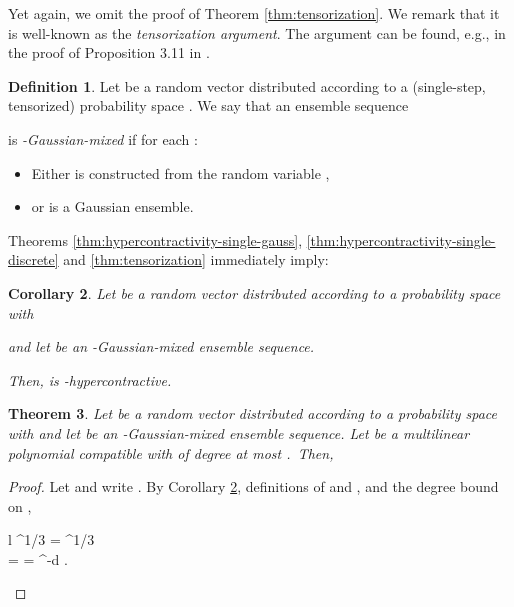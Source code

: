 \documentclass{daj}
\newcommand{\1}{\mathbbm{1}}
\theoremstyle{plain}
\newtheorem{theorem}{Theorem}[section]
\newtheorem{corollary}[theorem]{Corollary}
\theoremstyle{definition}
\newtheorem{definition}[theorem]{Definition}
\DeclareMathOperator*{\EE}{E}
\begin{document}
Yet again, we omit the proof of Theorem \ref{thm:tensorization}.
We remark that it is well-known as the \emph{tensorization argument}.
The argument can be found, e.g., in the proof of Proposition 3.11
in \cite{MOO10}.

\begin{definition}
Let  be a random vector distributed
according to a (single-step, tensorized) probability space 
.
We say that an ensemble sequence

is \emph{-Gaussian-mixed} if
for each :
\begin{itemize}
\item Either  is constructed
from the random variable ,
\item or  is a Gaussian ensemble.
\end{itemize}
\end{definition}

Theorems \ref{thm:hypercontractivity-single-gauss},
\ref{thm:hypercontractivity-single-discrete} and
\ref{thm:tensorization} immediately imply:

\begin{corollary}
\label{cor:hypercontractivity}
Let  be a random vector distributed according to
a probability space
 with

and let  be an 
-Gaussian-mixed
ensemble sequence.

Then,  is -hypercontractive.
\end{corollary}

\begin{theorem}
\label{thm:hypercontractivity-degree}
Let  be a random vector distributed according to a
probability space 
with 
and let  be an -Gaussian-mixed
ensemble sequence.
Let  be a multilinear
polynomial compatible with  of degree at most .\
Then,

\end{theorem}

\begin{proof}
Let  and write
. 
By Corollary \ref{cor:hypercontractivity}, definitions of  and
, and the degree bound on ,
\begin{IEEEeqnarray*}{l}
\EE {}^{1/3} 
= \EE \left[ \left| T_\rho T_{1/\rho} P(\underline{\mathcal{X}}) 
\right|^3 \right]^{1/3}
\le \sqrt{ \EE \left[ (T_{1/\rho} P)^2 \right] }
\\ \qquad = 
\le \sqrt{ \sum_{\sigma} \rho^{-2d} \beta(\sigma)^2}
= \rho^{-d} \sqrt{ \EE[P^2] } \; .
\end{IEEEeqnarray*}
\end{proof}
\end{document}
